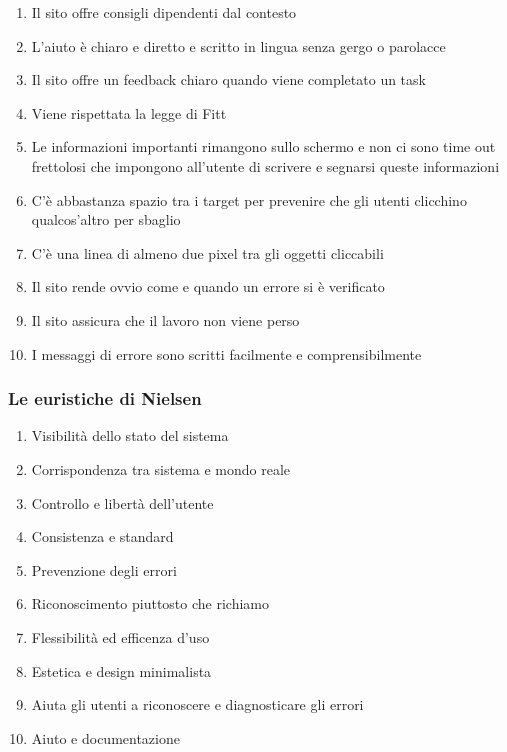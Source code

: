 \documentclass[../Report.tex]{subfiles}
\begin{document}
\begin{enumerate}
        \item Il sito offre consigli dipendenti dal contesto 
        \item L’aiuto è chiaro e diretto e scritto in lingua senza gergo o parolacce
        \item Il sito offre un feedback chiaro quando viene completato un task
        \item Viene rispettata la legge di Fitt
        \item Le informazioni importanti rimangono sullo schermo e non ci sono time out frettolosi che impongono all’utente di scrivere e segnarsi queste informazioni 
        \item C’è abbastanza spazio tra i target per prevenire che gli utenti clicchino qualcos’altro per sbaglio 
        \item C’è una linea di almeno due pixel tra gli oggetti cliccabili 
        \item Il sito rende ovvio come e quando un errore si è verificato 
        \item Il sito assicura che il lavoro non viene perso 
        \item I messaggi di errore sono scritti facilmente e comprensibilmente
        
    \end{enumerate}

    \subsubsection{Le euristiche di Nielsen }
    \begin{enumerate}
        \item Visibilità dello stato del sistema 
        \item Corrispondenza tra sistema e mondo reale
        \item Controllo e libertà dell’utente 
        \item Consistenza e standard
        \item Prevenzione degli errori 
        \item Riconoscimento piuttosto che richiamo 
        \item Flessibilità ed efficenza d’uso 
        \item Estetica e design minimalista
        \item Aiuta gli utenti a riconoscere e diagnosticare gli errori 
        \item Aiuto e documentazione    
    \end{enumerate}
\end{document}
